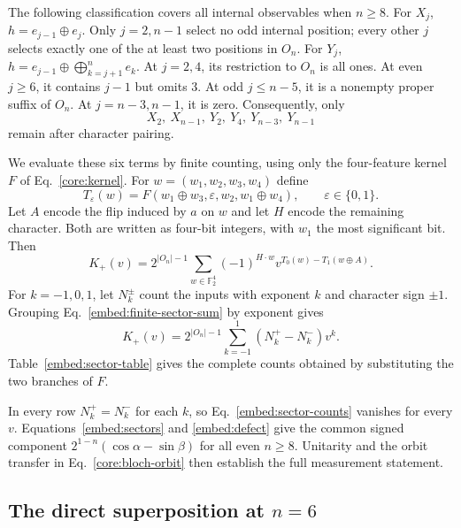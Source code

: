 The following classification covers all internal observables when $n\ge8$. For $X_j$, $h=e_{j-1}\oplus e_j$. Only $j=2,n-1$ select no odd internal position; every other $j$ selects exactly one of the at least two positions in $O_n$. For $Y_j$,
$h=e_{j-1}\oplus\bigoplus_{k=j+1}^n e_k$. At $j=2,4$, its restriction to $O_n$ is all ones. At even $j\ge6$, it contains $j-1$ but omits $3$. At odd $j\le n-5$, it is a nonempty proper suffix of $O_n$. At $j=n-3,n-1$, it is zero. Consequently, only
\begin{equation}
 X_2,\ X_{n-1},\ Y_2,\ Y_4,\ Y_{n-3},\ Y_{n-1}
 \label{embed:six-remaining}
\end{equation}
remain after character pairing.

We evaluate these six terms by finite counting, using only the four-feature kernel $F$ of Eq.~\eqref{core:kernel}. For $w=(w_1,w_2,w_3,w_4)$ define
\begin{equation}
 T_\varepsilon(w)=F(w_1\oplus w_3,\varepsilon,w_2,w_1\oplus w_4),
 \qquad\varepsilon\in\{0,1\}.
 \label{embed:restricted-kernel}
\end{equation}
Let $A$ encode the flip induced by $a$ on $w$ and let $H$ encode the remaining character. Both are written as four-bit integers, with $w_1$ the most significant bit. Then
\begin{equation}
 K_+(v)=2^{|O_n|-1}\sum_{w\in\mathbb F_2^4}
 (-1)^{H\cdot w}v^{T_0(w)-T_1(w\oplus A)}.
 \label{embed:finite-sector-sum}
\end{equation}
For $k=-1,0,1$, let $N_k^\pm$ count the inputs with exponent $k$ and character sign $\pm1$. Grouping Eq.~\eqref{embed:finite-sector-sum} by exponent gives
\begin{equation}
 K_+(v)=2^{|O_n|-1}\sum_{k=-1}^{1}(N_k^+-N_k^-)v^k.
 \label{embed:sector-counts}
\end{equation}
Table~\ref{embed:sector-table} gives the complete counts obtained by substituting the two branches of $F$.

In every row $N_k^+=N_k^-$ for each $k$, so Eq.~\eqref{embed:sector-counts} vanishes for every $v$. Equations~\eqref{embed:sectors} and \eqref{embed:defect} give the common signed component $2^{1-n}(\cos\alpha-\sin\beta)$ for all even $n\ge8$. Unitarity and the orbit transfer in Eq.~\eqref{core:bloch-orbit} then establish the full measurement statement.

\subsection{The direct superposition at \texorpdfstring{$n=6$}{n=6}}
\label{embed:app-six-direct}

